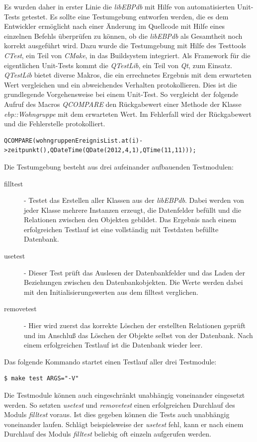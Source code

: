 Es wurden daher in erster Linie die \textit{libEBPdb} mit Hilfe von automatisierten Unit-Tests getestet. Es sollte eine Testumgebung entworfen werden, die es
dem Entwickler ermöglicht nach einer Änderung im Quellcode mit Hilfe eines einzelnen Befehls überprüfen zu können, ob die \textit{libEBPdb} als Gesamtheit noch
korrekt ausgeführt wird. Dazu wurde die Testumgebung mit Hilfe des Testtools \textit{CTest}, ein Teil von \textit{CMake}, in das Buildsystem integriert. Als Framework
für die eigentlichen Unit-Tests kommt die \textit{QTestLib}, ein Teil von \textit{Qt}, zum Einsatz. \textit{QTestLib} bietet diverse Makros, die ein errechnetes Ergebnis mit dem
erwarteten Wert vergleichen und ein abweichendes Verhalten protokollieren. Dies ist die grundlegende Vorgehensweise bei einem Unit-Test. So
vergleicht der folgende Aufruf des Macros \textit{QCOMPARE} den Rückgabewert einer Methode der Klasse \textit{ebp::Wohngruppe} mit dem erwarteten Wert. Im Fehlerfall
wird der Rückgabewert und die Fehlerstelle protokolliert.
\begin{lstlisting}
QCOMPARE(wohngruppenEreignisList.at(i)->zeitpunkt(),QDateTime(QDate(2012,4,1),QTime(11,11)));
\end{lstlisting}
Die Testumgebung besteht aus drei aufeinander aufbauenden Testmodulen:
\begin{description}
 \item [fill\textunderscore test] - Testet das Erstellen aller Klassen aus der \textit{libEBPdb}. Dabei werden von jeder Klasse mehrere Instanzen erzeugt, die
Datenfelder befüllt und die Relationen zwischen den Objekten gebildet. Das Ergebnis nach einem erfolgreichen Testlauf ist eine vollständig mit
Testdaten befüllte Datenbank.
 \item [use\textunderscore test] - Dieser Test prüft das Auslesen der Datenbankfelder und das Laden der Beziehungen zwischen den Datenbankobjekten. Die
Werte werden dabei mit den Initialisierungswerten aus dem fill\textunderscore test verglichen.
 \item [remove\textunderscore test] - Hier wird zuerst das korrekte Löschen der erstellten Relationen geprüft und im Anschluß das Löschen der Objekte
selbst von der Datenbank. Nach einem erfolgreichen Testlauf ist die Datenbank wieder leer.
\end{description}
Das folgende Kommando startet einen Testlauf aller drei Testmodule:
\begin{lstlisting}
$ make test ARGS="-V"
\end{lstlisting}
Die Testmodule können auch eingeschränkt unabhängig voneinander eingesetzt werden. So setzten \textit{use\textunderscore test} und \textit{remove\textunderscore test}
einen erfolgreichen Durchlauf des Moduls \textit{fill\textunderscore test} voraus. Ist dies gegeben können die Tests auch unabhängig voneinander laufen.
Schlägt beispielsweise der \textit{use\textunderscore test} fehl, kann er nach einem Durchlauf des Moduls \textit{fill\textunderscore test} beliebig oft einzeln
aufgerufen werden.

